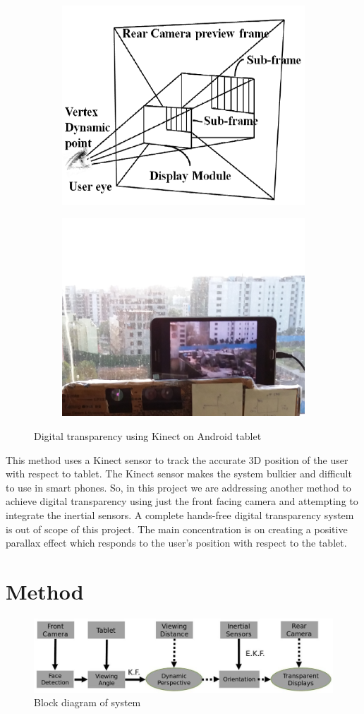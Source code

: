\documentclass[12pt,twocolumn,letterpaper]{article}
\begin{document}
\begin{figure}[!htbp]
\centering
\begin{subfigure}{0.22\textwidth}
\includegraphics[height=30 mm]{transparenttablet}
\end{subfigure}
\begin{subfigure}{0.22\textwidth}
\includegraphics[height=30 mm]{transparenttablet1}
\end{subfigure}
\caption{Digital transparency using Kinect on Android tablet}
\label{fig:digitaltransparency}
\end{figure}

This method uses a Kinect sensor to track the accurate 3D position of the user with respect to tablet. The Kinect sensor makes the system bulkier and difficult to use in smart phones. So, in this project we are addressing another method to achieve digital transparency using just the front facing camera and attempting to integrate the inertial sensors. A complete hands-free digital transparency system is out of scope of this project. The main concentration is on creating a positive parallax effect which responds to the user's position with respect to the tablet.

\section{Method}
\begin{figure}[!htbp]
\includegraphics[scale=0.21]{block}
\caption{Block diagram of system}
\label{fig:blockdia}
\end{figure}
\end{document}
